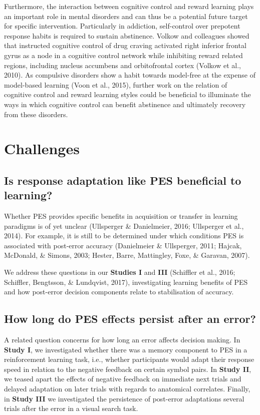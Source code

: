 \documentclass[12pt,openany]{book}
\theoremstyle{definition}
\theoremstyle{definition}
\theoremstyle{definition}
\theoremstyle{remark}
\begin{document}
Furthermore, the interaction between cognitive control and reward
learning plays an important role in mental disorders and can thus be a
potential future target for specific intervention. Particularly in
addiction, self-control over prepotent response habits is required to
sustain abstinence. Volkow and colleagues showed that instructed
cognitive control of drug craving activated right inferior frontal gyrus
as a node in a cognitive control network while inhibiting reward related
regions, including nucleus accumbens and orbitofrontal cortex (Volkow et
al., 2010). As compulsive disorders show a habit towards model-free at
the expense of model-based learning (Voon et al., 2015), further work on
the relation of cognitive control and reward learning styles could be
beneficial to illuminate the ways in which cognitive control can benefit
abstinence and ultimately recovery from these disorders.

\section{Challenges}\label{challenges}

\subsection{Is response adaptation like PES beneficial to
learning?}\label{is-response-adaptation-like-pes-beneficial-to-learning}

Whether PES provides specific benefits in acquisition or transfer in
learning paradigms is of yet unclear (Ullsperger \& Danielmeier, 2016;
Ullsperger et al., 2014). For example, it is still to be determined
under which conditions PES is associated with post-error accuracy
(Danielmeier \& Ullsperger, 2011; Hajcak, McDonald, \& Simons, 2003;
Hester, Barre, Mattingley, Foxe, \& Garavan, 2007).

We address these questions in our \textbf{Studies I} and \textbf{III}
(Schiffler et al., 2016; Schiffler, Bengtsson, \& Lundqvist, 2017),
investigating learning benefits of PES and how post-error decision
components relate to stabilisation of accuracy.

\subsection{How long do PES effects persist after an
error?}\label{how-long-do-pes-effects-persist-after-an-error}

A related question concerns for how long an error affects decision
making. In \textbf{Study I}, we investigated whether there was a memory
component to PES in a reinforcement learning task, i.e., whether
participants would adapt their response speed in relation to the
negative feedback on certain symbol pairs. In \textbf{Study II}, we
teased apart the effects of negative feedback on immediate next trials
and delayed adaptation on later trials with regards to anatomical
correlates. Finally, in \textbf{Study III} we investigated the
persistence of post-error adaptations several trials after the error in
a visual search task.
\end{document}
